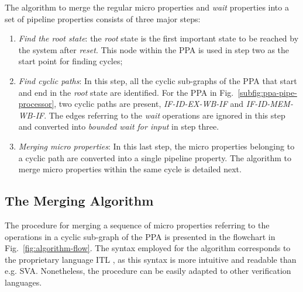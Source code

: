 The algorithm to merge the regular micro properties and \textit{wait} properties into a set of pipeline properties consists of three major steps:

\begin{enumerate}
\item \textit{Find the root state}: the \textit{root} state is the first important state to be reached by the system after \textit{reset}. This node within the PPA is used in step two as the start point for finding cycles;
\item \textit{Find cyclic paths}: In this step, all the cyclic sub-graphs of the PPA that start and end in the \textit{root} state are identified. For the PPA in Fig.~\ref{subfig:ppa-pipe-processor}, two cyclic paths are present, \textit{IF-ID-EX-WB-IF} and \textit{IF-ID-MEM-WB-IF}. The edges referring to the \textit{wait} operations are ignored in this step and converted into \textit{bounded wait for input} in step three.
\item \textit{Merging micro properties}: In this last step, the micro properties belonging to a cyclic path are converted into a single pipeline property. The algorithm to merge micro properties within the same cycle is detailed next. 
\end{enumerate}

\subsection*{The Merging Algorithm}

The procedure for merging a sequence of micro properties referring to the operations in a cyclic sub-graph of the PPA is presented in the flowchart in Fig.~\ref{fig:algorithm-flow}. The syntax employed for the algorithm corresponds to the proprietary language ITL \cite{onespin}, as this syntax is more intuitive and readable than e.g. SVA. Nonetheless, the procedure can be easily adapted to other verification languages. 

